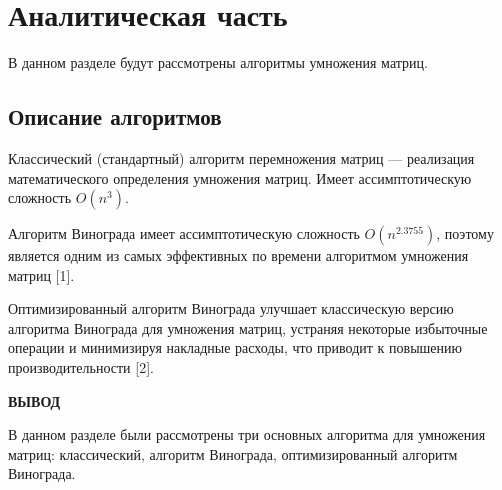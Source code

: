 \chapter{Аналитическая часть}

В данном разделе будут рассмотрены алгоритмы умножения матриц.

\section{Описание алгоритмов}

Классический (стандартный) алгоритм перемножения матриц --- реализация математического определения умножения матриц. Имеет ассимптотическую сложность \(O(n^{3})\).

Алгоритм Винограда имеет ассимптотическую сложность \(O(n^{2.3755})\), поэтому является одним из самых эффективных по времени алгоритмом умножения матриц [1].

Оптимизированный алгоритм Винограда улучшает классическую версию алгоритма Винограда для умножения матриц, устраняя некоторые избыточные операции и минимизируя накладные расходы, что приводит к повышению производительности [2].

\vspace{5mm}

\textbf{ВЫВОД}

В данном разделе были рассмотрены три основных алгоритма для умножения матриц: классический, алгоритм Винограда, оптимизированный алгоритм Винограда.